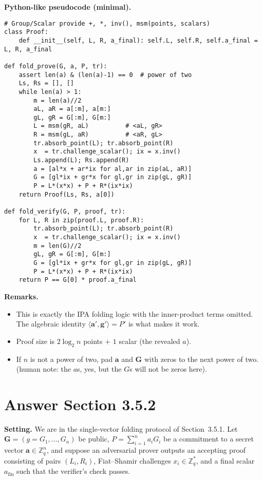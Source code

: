 \documentclass[11pt,a4paper]{article}
\begin{document}
\textbf{Python-like pseudocode (minimal).}
\begin{verbatim}
# Group/Scalar provide +, *, inv(), msm(points, scalars)
class Proof: 
    def __init__(self, L, R, a_final): self.L, self.R, self.a_final = L, R, a_final

def fold_prove(G, a, P, tr):
    assert len(a) & (len(a)-1) == 0  # power of two
    Ls, Rs = [], []
    while len(a) > 1:
        m = len(a)//2
        aL, aR = a[:m], a[m:]
        gL, gR = G[:m], G[m:]
        L = msm(gR, aL)          # <aL, gR>
        R = msm(gL, aR)          # <aR, gL>
        tr.absorb_point(L); tr.absorb_point(R)
        x  = tr.challenge_scalar(); ix = x.inv()
        Ls.append(L); Rs.append(R)
        a = [al*x + ar*ix for al,ar in zip(aL, aR)]
        G = [gl*ix + gr*x for gl,gr in zip(gL, gR)]
        P = L*(x*x) + P + R*(ix*ix)
    return Proof(Ls, Rs, a[0])

def fold_verify(G, P, proof, tr):
    for L, R in zip(proof.L, proof.R):
        tr.absorb_point(L); tr.absorb_point(R)
        x  = tr.challenge_scalar(); ix = x.inv()
        m = len(G)//2
        gL, gR = G[:m], G[m:]
        G = [gl*ix + gr*x for gl,gr in zip(gL, gR)]
        P = L*(x*x) + P + R*(ix*ix)
    return P == G[0] * proof.a_final
\end{verbatim}

\textbf{Remarks.}
\begin{itemize}
  \item This is exactly the IPA folding logic with the inner-product terms omitted. 
        The algebraic identity $\langle \mathbf{a}',\mathbf{g}'\rangle = P'$ is what makes it work.
  \item Proof size is $2\log_2 n$ points $+$ $1$ scalar (the revealed $a$).
  \item If $n$ is not a power of two, pad $\mathbf{a}$ and $\mathbf{G}$ with zeros to the next power of two. (human note: the $a$s, yes, but the $G$s will not be zeros here).
\end{itemize}


\section{Answer Section 3.5.2}

\textbf{Setting.} We are in the single-vector folding protocol of Section~3.5.1. 
Let $\mathbf{G}=(g=G_1,\dots,G_n)$ be public, $P=\sum_{i=1}^n a_i G_i$ be a commitment to a secret vector $\mathbf{a}\in\mathbb{Z}_q^n$, and suppose an adversarial prover outputs an accepting proof consisting of pairs $(L_i,R_i)$, Fiat--Shamir challenges $x_i\in\mathbb{Z}_q^\ast$, and a final scalar $a_{\mathrm{fin}}$ such that the verifier’s check passes.
\end{document}
